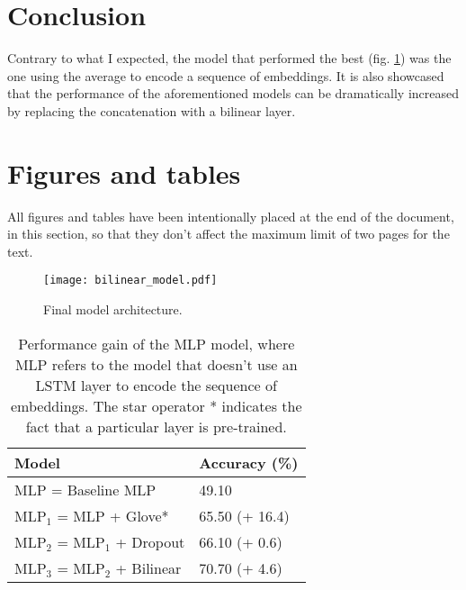 \documentclass[11pt,a4paper]{article}
\begin{document}
	\section{Conclusion}
	Contrary to what I expected, the model that performed the best (fig. \ref{fig:architecture}) was the one using the average to encode a sequence of embeddings. It is also showcased that the performance of the aforementioned models can be dramatically increased by replacing the concatenation with a bilinear layer.
	\clearpage
	\section{Figures and tables}
	All figures and tables have been intentionally placed at the end of the document, in this section, so that they don't affect the maximum limit of two pages for the text.
	\begin{figure}[H]
		\centering
		\texttt{[image: bilinear\_model.pdf]}
		\caption{Final model architecture.}
		\label{fig:architecture}
	\end{figure}

	\begin{table}[H]
		\centering
		\begin{tabular}{@{}ll@{}}
			\toprule
			\textbf{Model}               & \textbf{Accuracy (\%)} \\ \midrule
			MLP = Baseline MLP           & 49.10              \\
			MLP$_1$ = MLP + Glove*       & 65.50 (+ 16.4)     \\
			MLP$_2$ = MLP$_1$ + Dropout  & 66.10 (+ 0.6)      \\
			MLP$_3$ = MLP$_2$ + Bilinear & 70.70 (+ 4.6)     \\ \bottomrule
		\end{tabular}
		\caption{Performance gain of the MLP model, where MLP refers to the model that doesn't use an LSTM layer to encode the sequence of embeddings. The star operator * indicates the fact that a particular layer is pre-trained.}
		\label{tab:MLP-model}
	\end{table}
	
\end{document}
